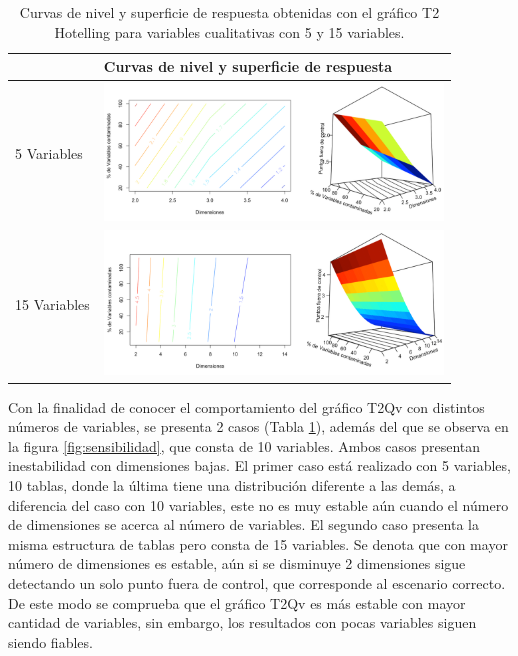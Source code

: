 \documentclass[water,article,submit,moreauthors,pdftex]{mdpi}
\begin{document}
\begin{table}[!ht]
\centering
\begin{tabular}{l|l|}
\cline{2-2}
             & \textbf{Curvas de nivel y superficie de respuesta} \\ \hline
\multicolumn{1}{|l|}{5 Variables}  & \includegraphics[width=9cm]{5var.png}  \\ \hline
\multicolumn{1}{|l|}{15 Variables} & \includegraphics[width=9cm]{15var.png} \\ \hline
\end{tabular}

\caption{Curvas de nivel y superficie de respuesta obtenidas con el gráfico T2 Hotelling para variables cualitativas con 5 y 15 variables.}

\label{tab:sensibilidadcasos}
\end{table}

Con la finalidad de conocer el comportamiento del gráfico T2Qv con
distintos números de variables, se presenta 2 casos (Tabla
\ref{tab:sensibilidadcasos}), además del que se observa en la figura
\ref{fig:sensibilidad}, que consta de 10 variables. Ambos casos
presentan inestabilidad con dimensiones bajas. El primer caso está
realizado con 5 variables, 10 tablas, donde la última tiene una
distribución diferente a las demás, a diferencia del caso con 10
variables, este no es muy estable aún cuando el número de dimensiones se
acerca al número de variables. El segundo caso presenta la misma
estructura de tablas pero consta de 15 variables. Se denota que con
mayor número de dimensiones es estable, aún si se disminuye 2
dimensiones sigue detectando un solo punto fuera de control, que
corresponde al escenario correcto. De este modo se comprueba que el
gráfico T2Qv es más estable con mayor cantidad de variables, sin
embargo, los resultados con pocas variables siguen siendo fiables.
\end{document}
